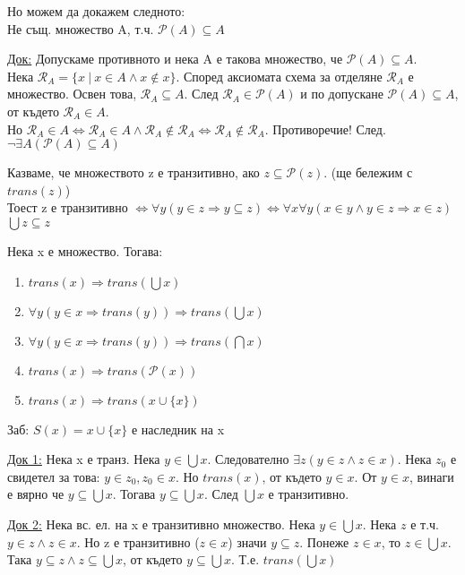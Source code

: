 \documentclass[fleqn, titlepage, 12pt]{report}
\begin{document}
Но можем да докажем следното:\\
 Не същ. множество A, т.ч. $ \mathcal{P}(A) \subseteq A$
\bigbreak

\underline{Док:} Допускаме противното и нека A е такова множество, че $ \mathcal{P}(A) \subseteq A$.\\
Нека $ \mathcal{R}_A = \{x\ |\ x \in A \land x \notin x\}$.
Според аксиомата схема за отделяне $ \mathcal{R}_A$ е множество.
Освен това, $ \mathcal{R}_A \subseteq A$. След $ \mathcal{R}_A \in \mathcal{P}(A) $ и по допускане
$ \mathcal{P}(A) \subseteq A$, от където $ \mathcal{R}_A \in A$.\\
Но $ \mathcal{R}_A \in A \Leftrightarrow \mathcal{R}_A \in A \land \mathcal{R}_A \notin \mathcal{R}_A \Leftrightarrow 
\mathcal{R}_A \notin \mathcal{R}_A$. Противоречие! След. $ \lnot \exists{A} ( \mathcal{P}(A) \subseteq A)$
\bigbreak

 Казваме, че множеството z е транзитивно, ако $z \subseteq \mathcal{P}(z) $. (ще бележим с $trans(z)$)\\
Тоест z е транзитивно $ \Leftrightarrow \forall{y} (y \in z \Rightarrow y \subseteq z)
\Leftrightarrow \forall{x} \forall{y} (x \in y \land y \in z \Rightarrow x \in z)$\\ $\bigcup{z} \subseteq z$
\bigbreak

 Нека x е множество. Тогава:
\begin{enumerate}
  \item $trans(x) \Rightarrow trans(\bigcup{x})$
  \item $ \forall{y} (y \in x \Rightarrow trans(y)) \Rightarrow trans(\bigcup{x})$
  \item $ \forall{y} (y \in x \Rightarrow trans(y)) \Rightarrow trans(\bigcap{x})$
  \item $trans(x) \Rightarrow trans( \mathcal{P}(x) )$
  \item $trans(x) \Rightarrow trans(x \cup \{ x\})$
\end{enumerate}
Заб: $S(x) = x \cup \{ x\}$ е наследник на x
\bigbreak

\underline{Док 1:} Нека x е транз. Нека $y \in \bigcup{x}$. Следователно $ \exists{z} (y \in z \land z \in x)$. Нека $z_0$
е свидетел за това: $y \in z_0, z_0 \in x$.
Но $trans(x)$, от където $y \in x$. От $y \in x$, винаги е вярно че $y \subseteq \bigcup{x} $.
Тогава $y \subseteq \bigcup{x} $. След $ \bigcup{x} $ е транзитивно.
\bigbreak

\underline{Док 2:} Нека вс. ел. на x е транзитивно множество. Нека $y \in \bigcup{x} $.
Нека $z$ е т.ч. $y \in z \land z \in x$.
Но z е транзитивно ($z \in x$) значи $y \subseteq z$. Понеже $z \in x$, то $z \in \bigcup{x} $.
Така $y \subseteq z \land z \subseteq \bigcup{x} $, от където $y \subseteq \bigcup{x} $. Т.е. $trans( \bigcup{x} ) $
\bigbreak
\end{document}
